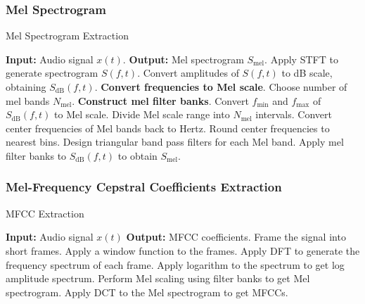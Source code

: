 \subsubsection{Mel Spectrogram}
\begin{algorithm}[H]
    \caption{Mel Spectrogram Extraction}
    \begin{algorithmic}[1]

        \STATE \textbf{Input:} Audio signal $x(t)$.
        \STATE \textbf{Output:} Mel spectrogram $S_{\text{mel}}$.
        \STATE Apply STFT to generate spectrogram $S(f, t)$.
        \STATE Convert amplitudes of $S(f, t)$ to dB scale, obtaining
        $S_{\text{dB}}(f, t)$.
        \STATE \textbf{Convert frequencies to Mel scale}.
        \STATE \hspace{10} Choose number of mel bands $N_{\text{mel}}$.
        \STATE \textbf{Construct mel filter banks}.
        \STATE \hspace{10} Convert $f_{\text{min}}$ and $f_{\text{max}}$ of
        $S_{\text{dB}}(f, t)$ to Mel scale.
        \STATE \hspace{10} Divide Mel scale range into $N_{\text{mel}}$
        intervals.
        \STATE \hspace{10} Convert center frequencies of Mel bands back to
        Hertz.
        \STATE \hspace{10} Round center frequencies to nearest bins.
        \STATE \hspace{10} Design triangular band pass filters for each Mel
        band.
        \STATE \hspace{10} Apply mel filter banks to $S_{\text{dB}}(f, t)$ to
        obtain $S_{\text{mel}}$.
    \end{algorithmic}
\end{algorithm}

\subsubsection{Mel-Frequency Cepstral Coefficients Extraction}

\begin{algorithm}[H]
    \caption{MFCC Extraction}
    \begin{algorithmic}[1]

        \STATE \textbf{Input:} Audio signal $x(t)$
        \STATE \textbf{Output:} MFCC coefficients.
        \STATE Frame the signal into short frames.
        \STATE Apply a window function to the frames.
        \STATE Apply DFT to generate the frequency spectrum of each frame.
        \STATE Apply logarithm to the spectrum to get log amplitude spectrum.
        \STATE Perform Mel scaling using filter banks to get Mel spectrogram.
        \STATE Apply DCT to the Mel spectrogram to get MFCCs.
    \end{algorithmic}
\end{algorithm}

